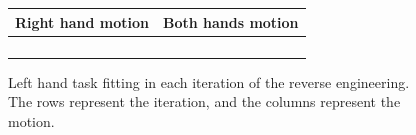 \documentclass[letterpaper, 10pt, conference]{ieeeconf}      %
\begin{document}
%      
%      
%

\begin{figure}[t]
\centering
\begin{tabular}{|c|c|}
  \hline
  Right hand motion & Both hands motion\\
  \hline
  \subfigure{
    \resizebox{.43\textwidth}{!}{
      
    }
  }
  &
  \subfigure{
    \resizebox{.43\textwidth}{!}{
      
    }
  }\\
  \hline
  \subfigure{
    \resizebox{.43\textwidth}{!}{
      
    }
  }
  &
  \subfigure{
    \resizebox{.43\textwidth}{!}{
      
    }
  }\\
  \hline
  \subfigure{
    \resizebox{.43\textwidth}{!}{
      
    } 
  }
  &
  \subfigure{
    \resizebox{.43\textwidth}{!}{
      
    }
  }\\ 
  \hline
  &
  \subfigure{
    \resizebox{.43\textwidth}{!}{
      
    }
  }\\
  \hline
\end{tabular}
\caption{Left hand task fitting in each iteration of the reverse engineering. The rows represent
the iteration, and the columns represent the motion.}
\end{figure}
\end{document}
